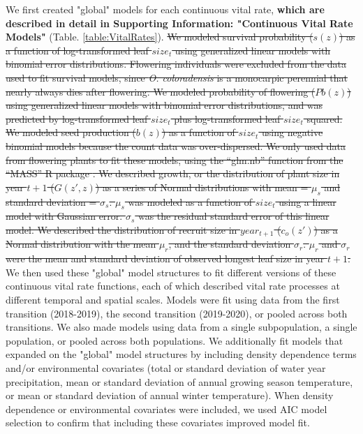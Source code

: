 \documentclass[12pt, letterpaper]{article}
\begin{document}
We first created "global" models for each continuous vital rate, \textbf{which are described in detail in Supporting Information: "Continuous Vital Rate Models"} (Table. \ref{table:VitalRates}). 
\sout{We modeled survival probability ($s(z)$) as a function of log-transformed leaf $size_t$ using generalized linear models with binomial error distributions. Flowering individuals were excluded from the data used to fit survival models, since \textit{O. coloradensis} is a monocarpic perennial that nearly always dies after flowering.
We modeled probability of flowering ($Pb(z)$) using generalized linear models with binomial error distributions, and was predicted by log-transformed leaf $size_t$ plus log-transformed leaf $size_t$ squared.
We modeled seed production ($b(z)$) as a function of $size_t$ using negative binomial models because the count data was over-dispersed. We only used data from flowering plants to fit these models, using the “glm.nb” function from the “MASS” R package \cite{Venables2002ModernS}.
We described growth, or the distribution of plant size in year ${t+1}$ ($G(z',z)$) as a series of Normal distributions with mean = $\mu_s$ and standard deviation = $\sigma_s$. $\mu_s$ was modeled as a function of $size_t$ using a linear model with Gaussian error. $\sigma_s$ was the residual standard error of this linear model. 
We described the distribution of recruit size in $year_{t+1}$ ($c_o(z')$) as a Normal distribution with the mean $\mu_r$, and the standard deviation $\sigma_r$. $\mu_r$ and $\sigma_r$ were the mean and standard deviation of observed longest leaf size in year ${t+1}$.}
We then used these "global" model structures to fit different versions of these continuous vital rate functions, each of which described vital rate processes at different temporal and spatial scales. Models were fit using data from the first transition (2018-2019), the second transition (2019-2020), or pooled across both transitions. We also made models using data from a single subpopulation, a single population, or pooled across both populations. We additionally fit models that expanded on the "global" model structures by including density dependence terms and/or environmental covariates (total or standard deviation of water year precipitation, mean or standard deviation of annual growing season temperature, or mean or standard deviation of annual winter temperature). When density dependence or environmental covariates were included, we used AIC model selection to confirm that including these covariates improved model fit.   
\end{document}
